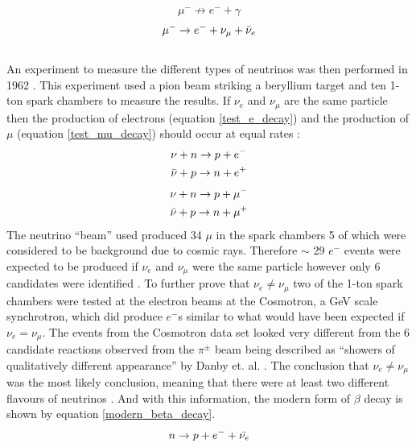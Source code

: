 \begin{equation}
    \mu^- \not\to e^- + \gamma
    \label{mu_forbiden_decay}
\end{equation}
\begin{equation}
    \mu^- \rightarrow e^- + \nu_\mu + \Bar{\nu}_e
    \label{proper_mu_decay}
\end{equation}
\\An experiment to measure the different types of neutrinos was then performed in 1962 \cite{DanbyG1962PhysRevLett.9.36}. This experiment used a pion beam striking a beryllium target and ten 1-ton spark chambers to measure the results. If $\nu_e$ and $\nu_\mu$ are the same particle then the production of electrons (equation \ref{test_e_decay}) and the production of $\mu$ (equation \ref{test_mu_decay}) should occur at equal rates \cite{DanbyG1962PhysRevLett.9.36}:
\begin{equation}
    \begin{split}
    \nu + n \rightarrow p + e^- \\
    \Bar{\nu} + p \rightarrow n + e^+
    \label{test_e_decay}
    \end{split}
\end{equation}
\begin{equation}
    \begin{split}
    \nu + n \rightarrow p + \mu^-  \\
    \Bar{\nu} + p \rightarrow n + \mu^+
    \label{test_mu_decay}
    \end{split}
\end{equation}
The neutrino ``beam'' used produced 34 $\mu$ in the spark chambers 5 of which were considered to be background due to cosmic rays. Therefore $\sim$ 29 $e^-$ events were expected to be produced if $\nu_e$ and $\nu_\mu$ were the same particle however only 6 candidates were identified \cite{DanbyG1962PhysRevLett.9.36}. To further prove that $\nu_e \not= \nu_\mu$ two of the 1-ton spark chambers were tested at the electron beams at the Cosmotron, a GeV scale synchrotron, which did produce $e^-$s similar to what would have been expected if $\nu_e = \nu_\mu$. The events from the Cosmotron data set looked very different from the 6 candidate reactions observed from the $\pi^\pm$ beam being described as ``showers of qualitatively different appearance'' by Danby et. al. \cite{DanbyG1962PhysRevLett.9.36}. The conclusion that $\nu_e \not= \nu_\mu$ was the most likely conclusion, meaning that there were at least two different flavours of neutrinos \cite{DanbyG1962PhysRevLett.9.36}. And with this information, the modern form of $\beta$ decay is shown by equation \ref{modern_beta_decay}.
\begin{equation}
    n \rightarrow p + e^- + \Bar{\nu_e} 
    \label{modern_beta_decay}
\end{equation}

